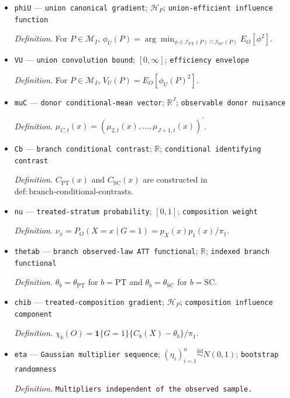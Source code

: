 \documentclass{article}
\begin{document}
\begin{itemize}
  \item \texttt{phiU} --- \texttt{union canonical gradient}; \(\mathcal H_P\); \texttt{union-\allowbreak{}efficient influence function}
  \par\smallskip\noindent\emph{Definition.} For \(P\in\mathcal M_I\), \(\phi_U(P)=\arg\min_{\phi\in\mathcal I_{\mathrm{PT}}(P)\cap\mathcal I_{\mathrm{SC}}(P)}E_O[\phi^2]\).
  \item \texttt{VU} --- \texttt{union convolution bound}; \([0,\infty]\); \texttt{efficiency envelope}
  \par\smallskip\noindent\emph{Definition.} For \(P\in\mathcal M_I\), \(V_U(P)=E_O[\phi_U(P)^2]\).
  \item \texttt{muC} --- \texttt{donor conditional-\allowbreak{}mean vector}; \(\mathbb R^J\); \texttt{observable donor nuisance}
  \par\smallskip\noindent\emph{Definition.} \(\mu_{C,t}(x)=(\mu_{2,t}(x),\ldots,\mu_{J+1,t}(x))^{\prime}\).
  \item \texttt{Cb} --- \texttt{branch conditional contrast}; \(\mathbb R\); \texttt{conditional identifying contrast}
  \par\smallskip\noindent\emph{Definition.} \(C_{\mathrm{PT}}(x)\) and \(C_{\mathrm{SC}}(x)\) are constructed in \(\mathrm{def{:}branch\text{-}conditional\text{-}contrasts}\).
  \item \texttt{nu} --- \texttt{treated-\allowbreak{}stratum probability}; \([0,1]\); \texttt{composition weight}
  \par\smallskip\noindent\emph{Definition.} \(\nu_x=P_O(X=x\mid G=1)=p_X(x)p_1(x)/\pi_1\).
  \item \texttt{thetab} --- \texttt{branch observed-\allowbreak{}law ATT functional}; \(\mathbb R\); \texttt{indexed branch functional}
  \par\smallskip\noindent\emph{Definition.} \(\theta_b=\theta_{\mathrm{PT}}\) for \(b=\mathrm{PT}\) and \(\theta_b=\theta_{\mathrm{SC}}\) for \(b=\mathrm{SC}\).
  \item \texttt{chib} --- \texttt{treated-\allowbreak{}composition gradient}; \(\mathcal H_P\); \texttt{composition influence component}
  \par\smallskip\noindent\emph{Definition.} \(\chi_b(O)=\mathbf 1\{G=1\}\{C_b(X)-\theta_b\}/\pi_1\).
  \item \texttt{eta} --- \texttt{Gaussian multiplier sequence}; \((\eta_i)_{i=1}^{n}\stackrel{\mathrm{iid}}{\sim}N(0,1)\); \texttt{bootstrap randomness}
  \par\smallskip\noindent\emph{Definition.} \texttt{Multipliers independent of the observed sample.}

\end{itemize}
\end{document}
